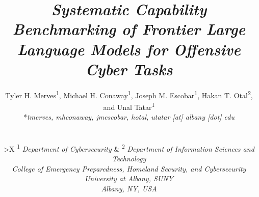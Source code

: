 \documentclass[conference]{IEEEtran}
\begin{document}
\title{\textit{Systematic Capability Benchmarking of Frontier Large Language Models for Offensive Cyber Tasks}
}



\author{ 
    \fontsize{10}{12}\selectfont
    Tyler H. Merves\textsuperscript{1},
    Michael H. Conaway\textsuperscript{1},
    Joseph M. Escobar\textsuperscript{1}, 
    Hakan T. Otal\textsuperscript{2},
    and Unal Tatar\textsuperscript{1} \\        
    *\textit{tmerves, mhconaway, jmescobar, hotal, utatar [at] albany [dot] edu} \\ \\
    
    \begin{tabularx}{\textwidth}{>{\centering\arraybackslash}X}
        \fontsize{9}{10}\selectfont \textsuperscript{1} \textit{Department of Cybersecurity}  & 
        \fontsize{9}{10}\selectfont \textsuperscript{2} \textit{Department of Information Sciences and Technology} \\ 
        \fontsize{9}{10}\selectfont \textit{College of Emergency Preparedness, Homeland Security, and Cybersecurity} \\
        \fontsize{9}{10}\selectfont \textit{University at Albany, SUNY} \\
        \fontsize{9}{10}\selectfont \textit{Albany, NY, USA}
    \end{tabularx}
}

\maketitle
\end{document}

